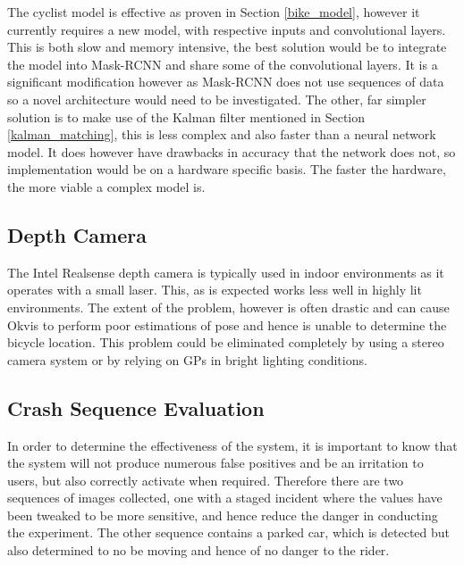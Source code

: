 \documentclass[11pt,twoside]{report}
\begin{document}
The cyclist model is effective as proven in Section \ref{bike_model}, however it currently requires a new model, with respective inputs and convolutional layers. This is both slow and memory intensive, the best solution would be to integrate the model into Mask-RCNN and share some of the convolutional layers. It is a significant modification however as Mask-RCNN does not use sequences of data so a novel architecture would need to be investigated.
\newline \newline
The other, far simpler solution is to make use of the Kalman filter mentioned in Section \ref{kalman_matching}, this is less complex and also faster than a neural network model. It does however have drawbacks in accuracy that the network does not, so implementation would be on a hardware specific basis. The faster the hardware, the more viable a complex model is.

\subsection{Depth Camera}

The Intel Realsense depth camera is typically used in indoor environments as it operates with a small laser. This, as is expected works less well in highly lit environments. The extent of the problem, however is often drastic and can cause Okvis to perform poor estimations of pose and hence is unable to determine the bicycle location. This problem could be eliminated completely by using a stereo camera system or by relying on GPs in bright lighting conditions.

\subsection{Crash Sequence Evaluation}

In order to determine the effectiveness of the system, it is important to know that the system will not produce numerous false positives and be an irritation to users, but also correctly activate when required. Therefore there are two sequences of images collected, one with a staged incident where the values have been tweaked to be more sensitive, and hence reduce the danger in conducting the experiment. The other sequence contains a parked car, which is detected but also determined to no be moving and hence of no danger to the rider.
\end{document}
